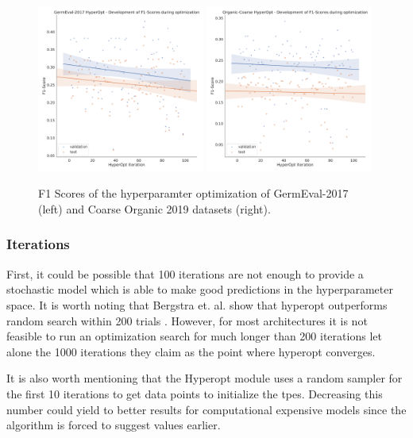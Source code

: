 \begin{figure}[ht]
	\centering
	\includegraphics[width=0.49\textwidth]{figures/06_results/06_hp_ge_lm_f1time}
	\includegraphics[width=0.49\textwidth]{figures/06_results/06_hp_og_lm_f1time}
	\caption{F1 Scores of the hyperparamter optimization of GermEval-2017 {(left)} and Coarse Organic 2019 datasets {(right)}.}
	\label{fig:06_F1GermEvalHp}
\end{figure}

\subsubsection*{Iterations}

First, it could be possible that 100 iterations are not enough to provide a stochastic model which is able to make good predictions in the hyperparameter space. It is worth noting that Bergstra et. al. show that hyperopt outperforms random search within 200 trials \cite{Bergstra2013}. However, for most architectures it is not feasible to run an optimization search for much longer than 200 iterations let alone the 1000 iterations they claim as the point where hyperopt converges. 
\medskip

It is also worth mentioning that the Hyperopt module uses a random sampler for the first 10 iterations to get data points to initialize the \glspl{tpe}. Decreasing this number could yield to better results for computational expensive models since the algorithm is forced to suggest values earlier.

